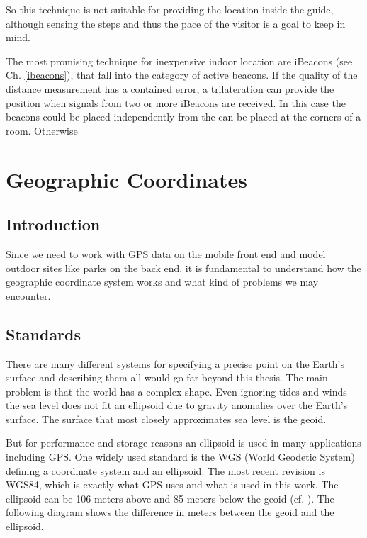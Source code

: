 So this technique is not suitable for providing the location inside the guide, although sensing the steps and thus the pace of the visitor is a goal to keep in mind.

The most promising technique for inexpensive indoor location are iBeacons (see Ch. \ref{ibeacons}), that fall into the category of active beacons. If the quality of the distance measurement has a contained error, a trilateration can provide the position when signals from two or more iBeacons are received. In this case the beacons could be placed independently from the can be placed at the corners of a room.
Otherwise 



\section{Geographic Coordinates}

\subsection{Introduction}

Since we need to work with GPS data on the mobile front end and model outdoor sites like parks on the back end, it is fundamental to understand how the geographic coordinate system works and what kind of problems we may encounter.

\subsection{Standards}

There are many different systems for specifying a precise point on the Earth's surface and describing them all would go far beyond this thesis. The main problem is that the world has a complex shape. Even ignoring tides and winds the sea level does not fit an ellipsoid due to gravity anomalies over the Earth's surface. The surface that most closely approximates sea level is the geoid. 

But for performance and storage reasons an ellipsoid is used in many applications including GPS. One widely used standard is the WGS (World Geodetic System) defining a coordinate system and an ellipsoid. The most recent revision is WGS84, which is exactly what GPS uses and what is used in this work. The ellipsoid can be 106 meters above and 85 meters below the geoid (cf. \cite{geoid}). The following diagram shows the difference in meters between the geoid and the ellipsoid.

